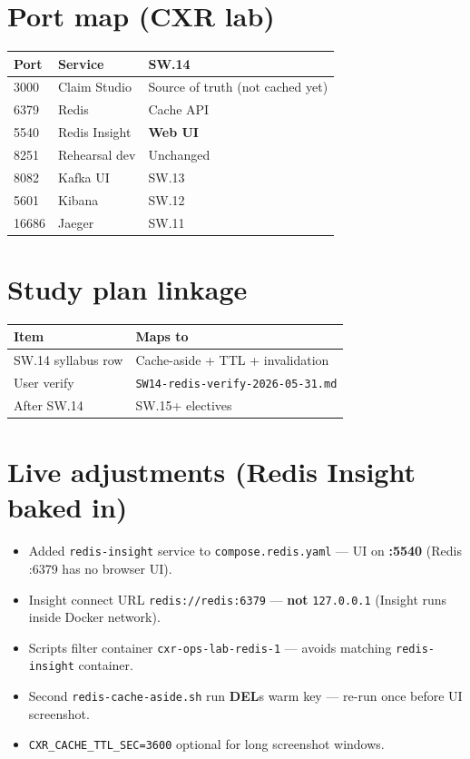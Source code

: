 \documentclass[11pt,a4paper]{report}
\begin{document}
\chapter{Port map (CXR lab)}

\begin{center}
\begin{tabular}{lll}
\toprule
Port & Service & SW.14 \\
\midrule
3000 & Claim Studio & Source of truth (not cached yet) \\
6379 & Redis & Cache API \\
5540 & Redis Insight & \textbf{Web UI} \\
8251 & Rehearsal dev & Unchanged \\
8082 & Kafka UI & SW.13 \\
5601 & Kibana & SW.12 \\
16686 & Jaeger & SW.11 \\
\bottomrule
\end{tabular}
\end{center}

\chapter{Study plan linkage}

\begin{center}
\begin{tabular}{ll}
\toprule
Item & Maps to \\
\midrule
SW.14 syllabus row & Cache-aside + TTL + invalidation \\
User verify & \texttt{SW14-redis-verify-2026-05-31.md} \\
After SW.14 & SW.15+ electives \\
\bottomrule
\end{tabular}
\end{center}

\chapter{Live adjustments (Redis Insight baked in)}

\begin{itemize}
  \item Added \texttt{redis-insight} service to \texttt{compose.redis.yaml} --- UI on \textbf{:5540} (Redis :6379 has no browser UI).
  \item Insight connect URL \texttt{redis://redis:6379} --- \textbf{not} \texttt{127.0.0.1} (Insight runs inside Docker network).
  \item Scripts filter container \texttt{cxr-ops-lab-redis-1} --- avoids matching \texttt{redis-insight} container.
  \item Second \texttt{redis-cache-aside.sh} run \textbf{DEL}s warm key --- re-run once before UI screenshot.
  \item \texttt{CXR\_CACHE\_TTL\_SEC=3600} optional for long screenshot windows.
\end{itemize}
\end{document}

